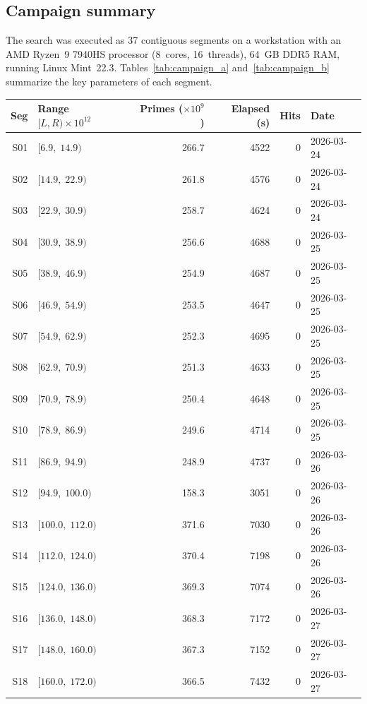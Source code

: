 \documentclass[11pt]{article}
\theoremstyle{definition}
\theoremstyle{remark}
\begin{document}
\subsection{Campaign summary}
\label{sec:campaign}

The search was executed as 37 contiguous segments on a workstation
with an AMD Ryzen~9 7940HS processor (8~cores, 16~threads),
64~GB DDR5 RAM, running Linux Mint~22.3.
Tables~\ref{tab:campaign_a} and~\ref{tab:campaign_b} summarize the
key parameters of each segment.

\begin{table}[ht]
\begin{center}
\small
\begin{tabular}{rlrrrl}
\toprule
Seg & Range $[L, R) \times 10^{12}$ & Primes ($\times 10^9$)
    & Elapsed (s) & Hits & Date \\
\midrule
S01 & $[6.9,\;14.9)$    & 266.7 & 4522 & 0 & 2026-03-24 \\
S02 & $[14.9,\;22.9)$   & 261.8 & 4576 & 0 & 2026-03-24 \\
S03 & $[22.9,\;30.9)$   & 258.7 & 4624 & 0 & 2026-03-24 \\
S04 & $[30.9,\;38.9)$   & 256.6 & 4688 & 0 & 2026-03-25 \\
S05 & $[38.9,\;46.9)$   & 254.9 & 4687 & 0 & 2026-03-25 \\
S06 & $[46.9,\;54.9)$   & 253.5 & 4647 & 0 & 2026-03-25 \\
S07 & $[54.9,\;62.9)$   & 252.3 & 4695 & 0 & 2026-03-25 \\
S08 & $[62.9,\;70.9)$   & 251.3 & 4633 & 0 & 2026-03-25 \\
S09 & $[70.9,\;78.9)$   & 250.4 & 4648 & 0 & 2026-03-25 \\
S10 & $[78.9,\;86.9)$   & 249.6 & 4714 & 0 & 2026-03-25 \\
S11 & $[86.9,\;94.9)$   & 248.9 & 4737 & 0 & 2026-03-26 \\
S12 & $[94.9,\;100.0)$  & 158.3 & 3051 & 0 & 2026-03-26 \\
S13 & $[100.0,\;112.0)$ & 371.6 & 7030 & 0 & 2026-03-26 \\
S14 & $[112.0,\;124.0)$ & 370.4 & 7198 & 0 & 2026-03-26 \\
S15 & $[124.0,\;136.0)$ & 369.3 & 7074 & 0 & 2026-03-26 \\
S16 & $[136.0,\;148.0)$ & 368.3 & 7172 & 0 & 2026-03-27 \\
S17 & $[148.0,\;160.0)$ & 367.3 & 7152 & 0 & 2026-03-27 \\
S18 & $[160.0,\;172.0)$ & 366.5 & 7432 & 0 & 2026-03-27 \\

\end{tabular}
\end{center}
\end{table}
\end{document}
